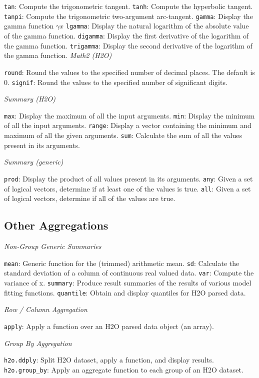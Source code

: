 {{{{\texttt{tan}}: Compute the trigonometric tangent. 
{\texttt{tanh}}: Compute the hyperbolic tangent. 
{\texttt{tanpi}}: Compute the trigonometric two-argument arc-tangent.  
{\texttt{gamma}}: Display the gamma function $\gamma{x}$  
{\texttt{lgamma}}: Display the natural logarithm of the absolute value of the gamma function.  
{\texttt{digamma}}: Display the first derivative of the logarithm of the gamma function.  
{\texttt{trigamma}}: Display the second derivative of the logarithm of the gamma function. 
\medskip
\emph{Math2 (H2O)}\par
{\texttt{round}}: Round the values to the specified number of decimal places. The default is 0.  
{\texttt{signif}}: Round the values to the specified number of significant digits. 

\emph{Summary (H2O)}\par
{\texttt{max}}: Display the maximum of all the input arguments.  
{\texttt{min}}: Display the minimum of all the input arguments.  
{\texttt{range}}: Display a vector containing the minimum and maximum of all the given arguments.  
{\texttt{sum}}: Calculate the sum of all the values present in its arguments. 

\medskip
\emph{Summary (generic)}\par
{\texttt{prod}}: Display the product of all values present in its arguments.  
{\texttt{any}}: Given a set of logical vectors, determine if at least one of the values is true.  
{\texttt{all}}: Given a set of logical vectors, determine if all of the values are true.

\subsection{Other Aggregations}

\medskip
\emph{Non-Group Generic Summaries}\par
{\texttt{mean}}: Generic function for the (trimmed) arithmetic mean.  
{\texttt{sd}}: Calculate the standard deviation of a column of continuous real valued data.  
{\texttt{var}}: Compute the variance of x. 
{\texttt{summary}}: Produce result summaries of the results of various model fitting functions.  
{\texttt{quantile}}: Obtain and display quantiles for H2O parsed data. 

\medskip
\emph{Row / Column Aggregation}\par
{\texttt{apply}: Apply a function over an H2O parsed data object (an array). 

\medskip
\emph{Group By Aggregation}\par
{\texttt{h2o.ddply}}: Split H2O dataset, apply a function, and display results. 
{\texttt{h2o.group\_by}}: Apply an aggregate function to each group of an H2O dataset. 

}}}}
